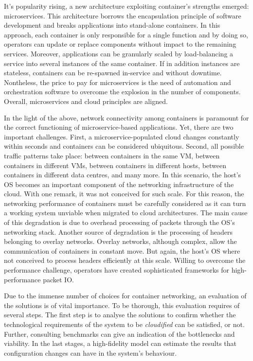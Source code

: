 \documentclass[conference]{IEEEtran}
\begin{document}
It's popularity rising, a new architecture exploiting container's strengths emerged: microservices. This architecture borrows the encapsulation principle of software development and breaks applications into stand-alone containers. In this approach, each container is only responsible for a single function and by doing so, operators can update or replace components without impact to the remaining services. Moreover, applications can be granularly scaled by load-balancing a service into several instances of the same container. If in addition instances are stateless, containers can be re-spawned in-service and without downtime. Nontheless, the price to pay for microservices is the need of automation and orchestration software to overcome the explosion in the number of components. Overall, microservices and cloud principles are aligned.

In the light of the above, network connectivity among containers is paramount for the correct functioning of microservice-based applications.  Yet, there are two important challenges. First, a microservice-populated cloud changes constantly within seconds and containers can be considered ubiquitous. Second, all possible traffic patterns take place: between containers in the same VM, between containers in different VMs, between containers in different hosts, between containers in different data centres, and many more. In this scenario, the host's OS becomes an important component of the networking infrastructure of the cloud. With one remark, it was not conceived for such scale. For this reason, the networking performance of containers must be carefully considered as it can turn a working system unviable when migrated to cloud architectures. The main cause of this degradation is due to overhead processing of packets through the OS's networking stack. Another source of degradation is the processing of headers belonging to overlay networks. Overlay networks, although complex, allow the communication of containers in constant move. But again, the host's OS where not conceived to process headers efficiently at this scale. Willing to overcome the performance challenge, operators have created sophisticated frameworks for high-performance packet IO.

Due to the immense number of choices for container networking, an evaluation of the solutions is of vital importance. To be thorough, this evaluation requires of several steps. The first step is to analyse the solutions to confirm whether the technological requirements of the system to be \textit{cloudified} can be satisfied, or not. Further, consulting benchmarks can give an indication of the bottlenecks and viability. In the last stages, a high-fidelity model can estimate the results that configuration changes can have in the system's behaviour.
\end{document}
